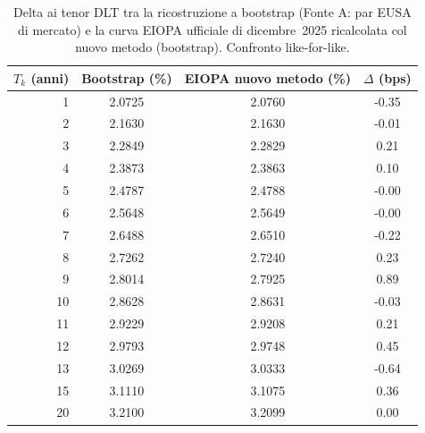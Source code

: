 \begin{table}[H]\centering\small
\caption{Delta ai tenor DLT tra la ricostruzione a bootstrap (Fonte A: par EUSA di mercato) e la curva EIOPA ufficiale di dicembre~2025 ricalcolata col nuovo metodo (bootstrap). Confronto like-for-like.}
\label{tab:delta-new-eusa}\renewcommand{\arraystretch}{1.15}
\begin{tabular}{rccc}
\toprule
$T_k$ (anni) & Bootstrap (\%) & EIOPA nuovo metodo (\%) & $\Delta$ (bps)\\
\midrule
\rowcolor{rowtint}1 & 2.0725 & 2.0760 & -0.35\\
2 & 2.1630 & 2.1630 & -0.01\\
\rowcolor{rowtint}3 & 2.2849 & 2.2829 & 0.21\\
4 & 2.3873 & 2.3863 & 0.10\\
\rowcolor{rowtint}5 & 2.4787 & 2.4788 & -0.00\\
6 & 2.5648 & 2.5649 & -0.00\\
\rowcolor{rowtint}7 & 2.6488 & 2.6510 & -0.22\\
8 & 2.7262 & 2.7240 & 0.23\\
\rowcolor{rowtint}9 & 2.8014 & 2.7925 & 0.89\\
10 & 2.8628 & 2.8631 & -0.03\\
\rowcolor{rowtint}11 & 2.9229 & 2.9208 & 0.21\\
12 & 2.9793 & 2.9748 & 0.45\\
\rowcolor{rowtint}13 & 3.0269 & 3.0333 & -0.64\\
15 & 3.1110 & 3.1075 & 0.36\\
\rowcolor{rowtint}20 & 3.2100 & 3.2099 & 0.00\\
\bottomrule
\end{tabular}
\end{table}
